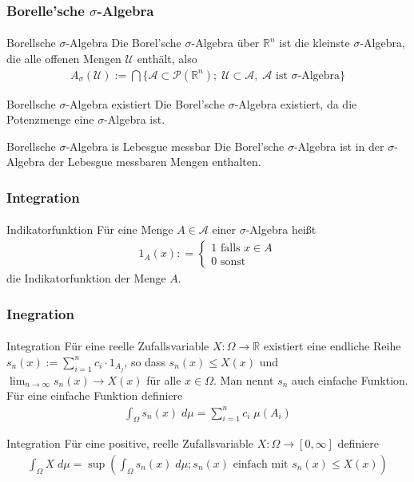 \documentclass{beamer}
\begin{document}
\begin{frame}
    \frametitle{Borelle'sche  $\sigma$-Algebra}
\framesubtitle{}
\begin{block}{Borellsche $\sigma$-Algebra}
Die Borel'sche   $\sigma$-Algebra über $\mathbb{R}^n$ ist die kleinste  $\sigma$-Algebra, die alle offenen Mengen $\mathcal{U}$ enthält, also 
\begin{align*}
A_\sigma (\mathcal{U}) := \bigcap \{  \mathcal{A} \subset \mathcal{P}(\mathbb{R}^n);  \;   \mathcal{U}  \subset  \mathcal{A},  \;  \mathcal{A} \text{ ist $\sigma$-Algebra} \}
\end{align*}
\end{block}

\begin{block}{Borellsche $\sigma$-Algebra existiert}
Die Borel'sche   $\sigma$-Algebra existiert, da die Potenzmenge eine   $\sigma$-Algebra ist.
\end{block}
\begin{block}{Borellsche $\sigma$-Algebra is Lebesgue messbar}
Die Borel'sche   $\sigma$-Algebra ist in der $\sigma$-Algebra der Lebesgue messbaren Mengen enthalten.
\end{block}
 \end{frame}



\begin{frame}
    \frametitle{Integration}
\framesubtitle{}

\begin{block}{Indikatorfunktion}
Für eine Menge $A \in \mathcal{A}$ einer $\sigma$-Algebra heißt
\begin{align*}
1_A(x) : = \begin{cases}
1 \text{ falls } x \in A
\\  0 \text{ sonst}
\end{cases}
\end{align*}
die Indikatorfunktion der Menge $A$.
\end{block}
 \end{frame}

\begin{frame}
    \frametitle{Inegration}
\framesubtitle{}
\begin{block}{Integration}
Für eine reelle Zufallsvariable $X: \Omega \to \mathbb{R}$ existiert eine endliche Reihe $s_n(x) := \sum_{i = 1}^{n} c_i \cdot 1_{A_j}$, so dass $s_n(x) \leq X(x)$ und  $\lim_{n \to \infty}  s_n(x) \to X(x)$ für alle $x \in \Omega$.
Man nennt $s_n$ auch einfache Funktion. Für eine einfache Funktion definiere
\begin{align*}
\int_\Omega s_n(x) \;  d\mu = \sum_{i=1}^{n} c_i \; \mu(A_i)
\end{align*}
\end{block}
\begin{block}{Integration}
Für eine positive, reelle Zufallsvariable $X: \Omega \to [0, \infty]$ definiere
\begin{align*}
\int_\Omega X \;  d \mu = \sup( \int_\Omega s_n(x) \;  d\mu ; s_n(x) \text{ einfach mit } s_n(x) \leq X(x))
\end{align*}
\end{block}
 \end{frame}
\end{document}
